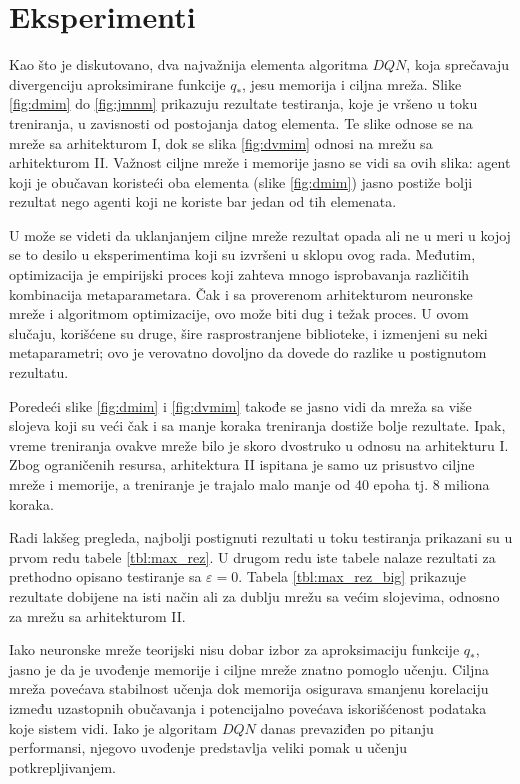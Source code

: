 \section{Eksperimenti}
\label{sec:eksperimenti}
Kao što je diskutovano, dva najvažnija elementa algoritma $DQN$, koja sprečavaju divergenciju aproksimirane funkcije $q_*$, jesu memorija i ciljna mreža. Slike \ref{fig:dmim} do \ref{fig:jmnm} prikazuju rezultate testiranja, koje je vršeno u toku treniranja, u zavisnosti od postojanja datog elementa. Te slike odnose se na mreže sa arhitekturom I, dok se slika \ref{fig:dvmim} odnosi na mrežu sa arhitekturom II. Važnost ciljne mreže i memorije jasno se vidi sa ovih slika: agent koji je obučavan koristeći oba elementa (slike \ref{fig:dmim}) jasno postiže bolji rezultat nego agenti koji ne koriste bar jedan od tih elemenata. 
\par 
U \cite{dqn_dm} može se videti da uklanjanjem ciljne mreže rezultat opada ali ne u meri u kojoj se to desilo u eksperimentima koji su izvršeni u sklopu ovog rada. Međutim, optimizacija je empirijski proces koji zahteva mnogo isprobavanja različitih kombinacija metaparametara. Čak i sa proverenom arhitekturom neuronske mreže i algoritmom optimizacije, ovo može biti dug i težak proces. U ovom slučaju, korišćene su druge, šire rasprostranjene biblioteke, i izmenjeni su neki metaparametri; ovo je verovatno dovoljno da dovede do razlike u postignutom rezultatu.
\par 
Poredeći slike \ref{fig:dmim} i \ref{fig:dvmim} takođe se jasno vidi da mreža sa više slojeva koji su veći čak i sa manje koraka treniranja dostiže bolje rezultate. Ipak, vreme treniranja ovakve mreže bilo je skoro dvostruko u odnosu na arhitekturu I. Zbog ograničenih resursa, arhitektura II ispitana je samo uz prisustvo ciljne mreže i memorije, a treniranje je trajalo malo manje od $40$ epoha tj. $8$ miliona koraka.
\par 
Radi lakšeg pregleda, najbolji postignuti rezultati u toku testiranja prikazani su u prvom redu tabele \ref{tbl:max_rez}. U drugom redu iste tabele nalaze rezultati za prethodno opisano testiranje sa $\varepsilon=0$. Tabela \ref{tbl:max_rez_big} prikazuje rezultate dobijene na isti način ali za dublju mrežu sa većim slojevima, odnosno za mrežu sa arhitekturom II.
\par 
Iako neuronske mreže teorijski nisu dobar izbor za aproksimaciju funkcije $q_*$, jasno je da je uvođenje memorije i ciljne mreže znatno pomoglo učenju. Ciljna mreža povećava stabilnost učenja dok memorija osigurava smanjenu korelaciju između uzastopnih obučavanja i potencijalno povećava iskorišćenost podataka koje sistem vidi. Iako je algoritam $DQN$ danas prevaziđen po pitanju performansi, njegovo uvođenje predstavlja veliki pomak u učenju potkrepljivanjem.

